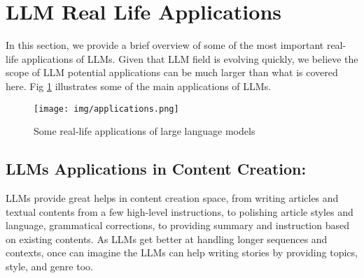\documentclass[conference]{IEEEtran}
\begin{document}
\iffalse
Putting together these sets of capabilities, models can be viewed from a very higher dimension, figure \ref{fig:comparison} shows the overall comparison of the models. As it can be seen from this perspective, Unavailable and Enormous models are the winners of this comparison.
\begin{figure*}
    \centering
    \texttt{[image: img/comparison.pdf]}
    \caption{Comparison of different capabilities with regards to model size. \textcolor{blue}{SM comment: right now many models seems to be squeezed on the same line near each other, maybe we need to change this graph scale to make the differences more visible.} \textcolor{red}{MA comment: I did try few things but I think I couldn't find a reasonable way to display it.} \textcolor{red}{SM: we should improve this figure. For both visual aesthetic (the lines are not so bright), to what information reader can get in a quick glance.}}
    \label{fig:comparison}
\end{figure*}
\fi








\iffalse

\section{LLM Real Life Applications}
\label{sec:LLM_applications}
In this section, we provide a brief overview of some of the most important real-life applications of LLMs. Given that LLM field is evolving quickly, we believe the scope of LLM potential applications can be much larger than what is covered here. Fig \ref{fig:applications} illustrates some of the main applications of LLMs.
\begin{figure}
    \centering
    \texttt{[image: img/applications.png]}
    \caption{Some real-life applications of large language models}
    \label{fig:applications}
\end{figure}

\subsection{LLMs Applications in Content Creation:}
LLMs provide great helps in content creation space, from writing articles and textual contents from a few high-level instructions, to polishing article styles and language, grammatical corrections, to providing summary and instruction based on existing contents. As LLMs get better at handling longer sequences and contexts, once can imagine the LLMs can help writing stories by providing topics, style, and genre too.
\end{document}
